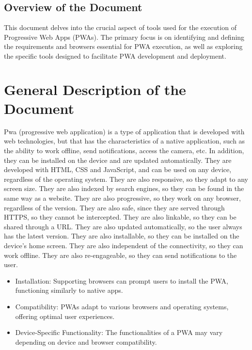 \documentclass[12pt,a4paper, twosite]{article}
\begin{document}
\subsection{Overview of the Document}
\label{sec:orgdaca22c}

This document delves into the crucial aspect of tools used for the execution of Progressive Web Apps (PWAs). The primary focus is on identifying and defining the requirements and browsers essential for PWA execution, as well as exploring the specific tools designed to facilitate PWA development and deployment.


\section{General Description of the Document}
\label{sec:orgc1c4017}

Pwa (progressive web application) is a type of application that is developed with web technologies, but that has the characteristics of a native application, such as the ability to work offline, send notifications, access the camera, etc. In addition, they can be installed on the device and are updated automatically. They are developed with HTML, CSS and JavaScript, and can be used on any device, regardless of the operating system. They are also responsive, so they adapt to any screen size. They are also indexed by search engines, so they can be found in the same way as a website. They are also progressive, so they work on any browser, regardless of the version. They are also safe, since they are served through HTTPS, so they cannot be intercepted. They are also linkable, so they can be shared through a URL. They are also updated automatically, so the user always has the latest version. They are also installable, so they can be installed on the device's home screen. They are also independent of the connectivity, so they can work offline. They are also re-engageable, so they can send notifications to the user.

\begin{itemize}
  
  \item Installation: Supporting browsers can prompt users to install the PWA, functioning similarly to native apps.
  \item Compatibility: PWAs adapt to various browsers and operating systems, offering optimal user experiences.
  \item Device-Specific Functionality: The functionalities of a PWA may vary depending on device and browser compatibility.
  
\end{itemize}
\end{document}
